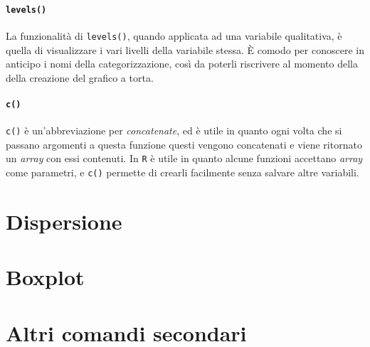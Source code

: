 \paragraph*{\texttt{levels()}} La funzionalità di \texttt{levels()}, quando
applicata ad una variabile qualitativa, è quella di visualizzare i vari livelli
della variabile stessa. È comodo per conoscere in anticipo i nomi della
categorizzazione, così da poterli riscrivere al momento della della creazione
del grafico a torta.

\paragraph*{\texttt{c()}} \texttt{c()} è un'abbreviazione per
\textit{concatenate}, ed è utile in quanto ogni volta che si passano argomenti
a questa funzione questi vengono concatenati e viene ritornato un
\textit{array} con essi contenuti. In \texttt{R} è utile in quanto alcune
funzioni accettano \textit{array} come parametri, e \texttt{c()} permette di
crearli facilmente senza salvare altre variabili.

\section{Dispersione}

\section{Boxplot}

\section{Altri comandi secondari}


